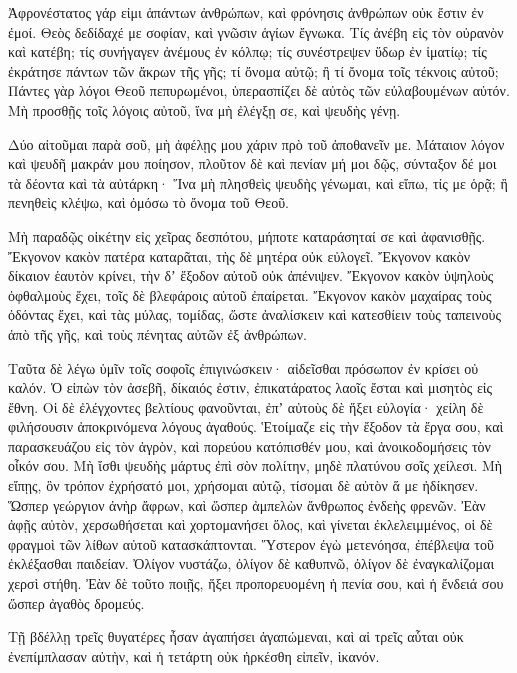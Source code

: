 {\par }{\PP {}Ἀφρονέστατος γάρ εἰμι ἁπάντων ἀνθρώπων, καὶ φρόνησις ἀνθρώπων οὐκ ἔστιν ἐν ἐμοί.
Θεὸς δεδίδαχέ με σοφίαν, καὶ γνῶσιν ἁγίων ἔγνωκα.
Τίς ἀνέβη εἰς τὸν οὐρανὸν καὶ κατέβη; τίς συνήγαγεν ἀνέμους ἐν κόλπῳ; τίς συνέστρεψεν ὕδωρ ἐν ἱματίῳ; τίς ἐκράτησε πάντων τῶν ἄκρων τῆς γῆς; τί ὄνομα αὐτῷ; ἢ τί ὄνομα τοῖς τέκνοις αὐτοῦ;
Πάντες γὰρ λόγοι Θεοῦ πεπυρωμένοι, ὑπερασπίζει δὲ αὐτὸς τῶν εὐλαβουμένων αὐτόν.
Μὴ προσθῇς τοῖς λόγοις αὐτοῦ, ἵνα μὴ ἐλέγξῃ σε, καὶ ψευδὴς γένῃ.
\par }{\PP {}Δύο αἰτοῦμαι παρὰ σοῦ, μὴ ἀφέλῃς μου χάριν πρὸ τοῦ ἀποθανεῖν με.
Μάταιον λόγον καὶ ψευδῆ μακράν μου ποίησον, πλοῦτον δὲ καὶ πενίαν μή μοι δῷς, σύνταξον δέ μοι τὰ δέοντα καὶ τὰ αὐτάρκη·
Ἵνα μὴ πλησθεὶς ψευδὴς γένωμαι, καὶ εἴπω, τίς με ὁρᾷ; ἢ πενηθεὶς κλέψω, καὶ ὀμόσω τὸ ὄνομα τοῦ Θεοῦ.
\par }{\PP {}Μὴ παραδῷς οἰκέτην εἰς χεῖρας δεσπότου, μήποτε καταράσηταί σε καὶ ἀφανισθῇς.
Ἔκγονον κακὸν πατέρα καταρᾶται, τὴς δὲ μητέρα οὐκ εὐλογεῖ.
Ἔκγονον κακὸν δίκαιον ἑαυτὸν κρίνει, τὴν δʼ ἔξοδον αὐτοῦ οὐκ ἀπένιψεν.
Ἔκγονον κακὸν ὑψηλοὺς ὀφθαλμοὺς ἔχει, τοῖς δὲ βλεφάροις αὐτοῦ ἐπαίρεται.
Ἔκγονον κακὸν μαχαίρας τοὺς ὀδόντας ἔχει, καὶ τὰς μύλας, τομίδας, ὥστε ἀναλίσκειν καὶ κατεσθίειν τοὺς ταπεινοὺς ἀπὸ τῆς γῆς, καὶ τοὺς πένητας αὐτῶν ἐξ ἀνθρώπων.
\par }{\PP {}Ταῦτα δὲ λέγω ὑμῖν τοῖς σοφοῖς ἐπιγινώσκειν· αἰδεῖσθαι πρόσωπον ἐν κρίσει οὐ καλόν.
Ὁ εἰπὼν τὸν ἀσεβῆ, δίκαιός ἐστιν, ἐπικατάρατος λαοῖς ἔσται καὶ μισητὸς εἰς ἔθνη.
Οἱ δὲ ἐλέγχοντες βελτίους φανοῦνται, ἐπʼ αὐτοὺς δὲ ἥξει εὐλογία·
χείλη δὲ φιλήσουσιν ἀποκρινόμενα λόγους ἀγαθούς.
Ἑτοίμαζε εἰς τὴν ἔξοδον τὰ ἔργα σου, καὶ παρασκευάζου εἰς τὸν ἀγρὸν, καὶ πορεύου κατόπισθέν μου, καὶ ἀνοικοδομήσεις τὸν οἶκόν σου.
Μὴ ἴσθι ψευδὴς μάρτυς ἐπὶ σὸν πολίτην, μηδὲ πλατύνου σοῖς χείλεσι.
Μὴ εἴπῃς, ὃν τρόπον ἐχρήσατό μοι, χρήσομαι αὐτῷ, τίσομαι δὲ αὐτὸν ἅ με ἠδίκησεν.
Ὥσπερ γεώργιον ἀνὴρ ἄφρων, καὶ ὥσπερ ἀμπελὼν ἄνθρωπος ἐνδεὴς φρενῶν.
Ἐὰν ἀφῇς αὐτὸν, χερσωθήσεται καὶ χορτομανήσει ὅλος, καὶ γίνεται ἐκλελειμμένος, οἱ δὲ φραγμοὶ τῶν λίθων αὐτοῦ κατασκάπτονται.
Ὕστερον ἐγὼ μετενόησα, ἐπέβλεψα τοῦ ἐκλέξασθαι παιδείαν.
Ὀλίγον νυστάζω, ὀλίγον δὲ καθυπνῶ, ὀλίγον δὲ ἐναγκαλίζομαι χερσὶ στήθη.
Ἐὰν δὲ τοῦτο ποιῇς, ἥξει προπορευομένη ἡ πενία σου, καὶ ἡ ἔνδειά σου ὥσπερ ἀγαθὸς δρομεύς.
\par }{\PP {}Τῇ βδέλλῃ τρεῖς θυγατέρες ἦσαν ἀγαπήσει ἀγαπώμεναι, καὶ αἱ τρεῖς αὗται οὐκ ἐνεπίμπλασαν αὐτὴν, καὶ ἡ τετάρτη οὐκ ἠρκέσθη εἰπεῖν, ἱκανόν.
}

